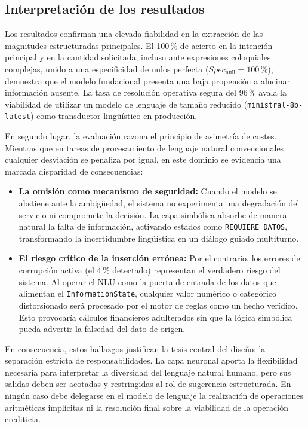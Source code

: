 \documentclass[12pt,a4paper]{report}
\begin{document}
\subsection{Interpretación de los resultados}

Los resultados confirman una elevada fiabilidad en la extracción de las magnitudes estructuradas principales. El 100\,\% de acierto en la intención principal y en la cantidad solicitada, incluso ante expresiones coloquiales complejas, unido a una especificidad de nulos perfecta ($Spec_{\text{null}} = 100\,$\%), demuestra que el modelo fundacional presenta una baja propensión a alucinar información ausente. La tasa de resolución operativa segura del 96\,\% avala la viabilidad de utilizar un modelo de lenguaje de tamaño reducido (\texttt{ministral-8b-latest}) como transductor lingüístico en producción.

En segundo lugar, la evaluación razona el principio de asimetría de costes. Mientras que en tareas de procesamiento de lenguaje natural convencionales cualquier desviación se penaliza por igual, en este dominio se evidencia una marcada disparidad de consecuencias:
\begin{itemize}
    \item \textbf{La omisión como mecanismo de seguridad:} Cuando el modelo se abstiene ante la ambigüedad, el sistema no experimenta una degradación del servicio ni compromete la decisión. La capa simbólica absorbe de manera natural la falta de información, activando estados como \texttt{REQUIERE\_DATOS}, transformando la incertidumbre lingüística en un diálogo guiado multiturno.
    \item \textbf{El riesgo crítico de la inserción errónea:} Por el contrario, los errores de corrupción activa (el 4\,\% detectado) representan el verdadero riesgo del sistema. Al operar el NLU como la puerta de entrada de los datos que alimentan el \texttt{InformationState}, cualquier valor numérico o categórico distorsionado será procesado por el motor de reglas como un hecho verídico. Esto provocaría cálculos financieros adulterados sin que la lógica simbólica pueda advertir la falsedad del dato de origen.
\end{itemize}

En consecuencia, estos hallazgos justifican la tesis central del diseño: la separación estricta de responsabilidades. La capa neuronal aporta la flexibilidad necesaria para interpretar la diversidad del lenguaje natural humano, pero sus salidas deben ser acotadas y restringidas al rol de sugerencia estructurada. En ningún caso debe delegarse en el modelo de lenguaje la realización de operaciones aritméticas implícitas ni la resolución final sobre la viabilidad de la operación crediticia.
\end{document}
